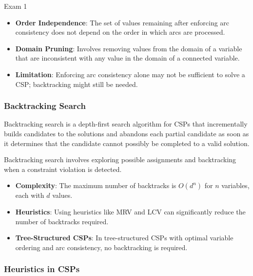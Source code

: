 \begin{examnotes}{Exam 1}
\begin{highlight}
        \begin{itemize}
            \item \textbf{Order Independence}: The set of values remaining after enforcing arc consistency does not depend on the order in which arcs are processed.
            \item \textbf{Domain Pruning}: Involves removing values from the domain of a variable that are inconsistent with any value in the domain of a connected variable.
            \item \textbf{Limitation}: Enforcing arc consistency alone may not be sufficient to solve a CSP; backtracking might still be needed.
        \end{itemize}
    \end{highlight}
    
    \subsubsection*{Backtracking Search}
    
    Backtracking search is a depth-first search algorithm for CSPs that incrementally builds candidates to the solutions and abandons each partial candidate as soon as it determines that the candidate 
    cannot possibly be completed to a valid solution.
    
    \begin{highlight}
        Backtracking search involves exploring possible assignments and backtracking when a constraint violation is detected.
        
        \begin{itemize}
            \item \textbf{Complexity}: The maximum number of backtracks is $O(d^n)$ for $n$ variables, each with $d$ values.
            \item \textbf{Heuristics}: Using heuristics like MRV and LCV can significantly reduce the number of backtracks required.
            \item \textbf{Tree-Structured CSPs}: In tree-structured CSPs with optimal variable ordering and arc consistency, no backtracking is required.
        \end{itemize}
    \end{highlight}
    
    \subsubsection*{Heuristics in CSPs}
    

\end{examnotes}

